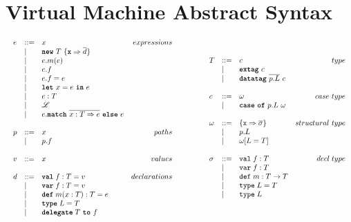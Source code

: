 \documentclass{article}
\newcommand{\keyw}[1]{\texttt{\textbf{#1}}}
\begin{document}
\section{Virtual Machine Abstract Syntax}

\[
\begin{array}{lll}
\begin{array}{lllr}
e & ::= & x & expressions \\
& | & \keyw{new}~T~\{\keyw{x} \Rightarrow \overline{d}\}&\\
& | & e.m(e) &\\
& | & e.f &\\
& | & e.f = e&\\
& | & \keyw{let}~x=e~\keyw{in}~e &\\
& | & e : T&\\
& | & \mathscr{L} &\\
& | & e.\keyw{match}~\overline{x:T \Rightarrow e}~\keyw{else}~e &\\
&&\\
p & ::= & x & paths \\
& | & p.f &\\
&&\\
v & ::= & x & values \\
&&\\
d & ::= & \keyw{val} \; f : T = v & declarations \\
  & |   & \keyw{var} \; f : T = v &\\
  & |   & \keyw{def} \; m(x:T) : T = e &\\
  & |   & \keyw{type} \; L = T &\\
  & |   & \keyw{delegate} \; T~\keyw{to}~f &\\
&&\\
\end{array}
& ~~~~~~
&
\begin{array}{lllr}
T & ::= & c & type \\
& | & \keyw{extag}~c &\\
& | & \keyw{datatag}~\overline{p.L}~c &\\
&&\\
c & ::= & \omega & case ~ type \\
& | & \keyw{case}~\keyw{of}~p.L~\omega &\\
&&\\
\omega & ::= & \{\texttt{x} \Rightarrow \overline{\sigma}\} & structural~type \\
& | & p.L &\\
& | & \omega[L=T] &\\
&&\\
\sigma & ::= & \texttt{val} \; f:T & decl \; type\\
       & |   & \texttt{var} \; f:T \\
       & |   & \texttt{def} \; m:T \rightarrow T \\
       & |   & \texttt{type} \; L = T &\\
       & |   & \texttt{type} \; L &\\
&&\\
\end{array}
\end{array}
\]
\end{document}
